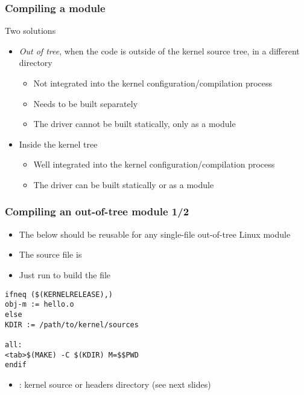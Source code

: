 \begin{frame}
  \frametitle{Compiling a module}
  Two solutions
  \begin{itemize}
  \item \emph{Out of tree}, when the code is outside of the kernel
    source tree, in a different directory
    \begin{itemize}
    \item Not integrated into the kernel configuration/compilation
      process
    \item Needs to be built separately
    \item The driver cannot be built statically, only as a module
    \end{itemize}
  \item Inside the kernel tree
    \begin{itemize}
    \item Well integrated into the kernel configuration/compilation
       process
    \item The driver can be built statically or as a module
    \end{itemize}
  \end{itemize}
\end{frame}

\begin{frame}[fragile]
  \frametitle{Compiling an out-of-tree module 1/2}
  \begin{itemize}
  \item The below  should be reusable for any single-file
    out-of-tree Linux module
  \item The source file is 
  \item Just run  to build the  file
  \end{itemize}
{\footnotesize
\begin{block}{}
\begin{verbatim}
ifneq ($(KERNELRELEASE),)
obj-m := hello.o
else
KDIR := /path/to/kernel/sources

all:
<tab>$(MAKE) -C $(KDIR) M=$$PWD
endif
\end{verbatim}
\end{block}
}

\begin{itemize}
\item {}: kernel source or headers directory (see next slides)
\end{itemize}
\end{frame}

